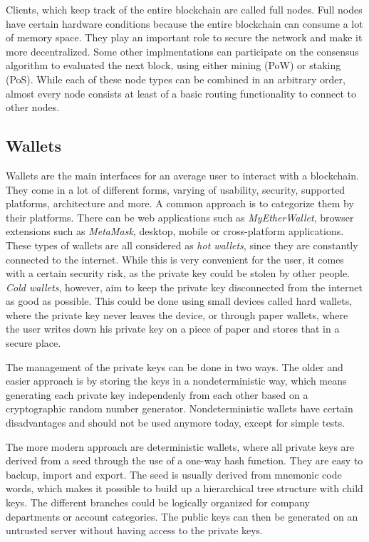 Clients, which keep track of the entire blockchain are called full nodes. Full nodes have certain
hardware conditions because the entire blockchain can consume a lot of memory space. They play an important role to secure the network and make it more decentralized.
Some other implmentations can participate on the consensus algorithm to evaluated the next block, using either mining (PoW) or staking (PoS). While each of these node types
can be combined in an arbitrary order, almost every node consists at least of a basic routing functionality to connect to other nodes.

\subsection{Wallets}
Wallets are the main interfaces for an average user to interact with a blockchain. They come in a lot of different forms, varying of usability, security, supported platforms,
architecture and more. A common approach is to categorize them by their platforms. There can be web applications such as \textit{MyEtherWallet}, browser extensions such as
\textit{MetaMask}, desktop, mobile or cross-platform applications. These types of wallets are all considered as \textit{hot wallets}, since they are constantly connected to the
internet. While this is very convenient for the user, it comes with a certain security risk, as the private key could be stolen by other people. \textit{Cold wallets},
however, aim to keep the private key disconnected from the internet as good as possible. This could be done using small devices called hard wallets, where the private
key never leaves the device, or through paper wallets, where the user writes down his private key on a piece of paper and stores that in a secure place.

The management of the private keys can be done in two ways. The older and easier approach is by storing the keys in a nondeterministic way, which means generating
each private key independenly from each other based on a cryptographic random number generator. Nondeterministic wallets have certain disadvantages and should not be
used anymore today, except for simple tests.

The more modern approach are deterministic wallets, where all private keys are derived from a seed through the use of a one-way hash function. They are easy to
backup, import and export. The seed is usually derived from mnemonic code words, which makes it possible to build up a hierarchical tree structure with child keys.
The different branches could be logically organized for company departments or account categories. The public keys can then be generated on an untrusted server
without having access to the private keys.

